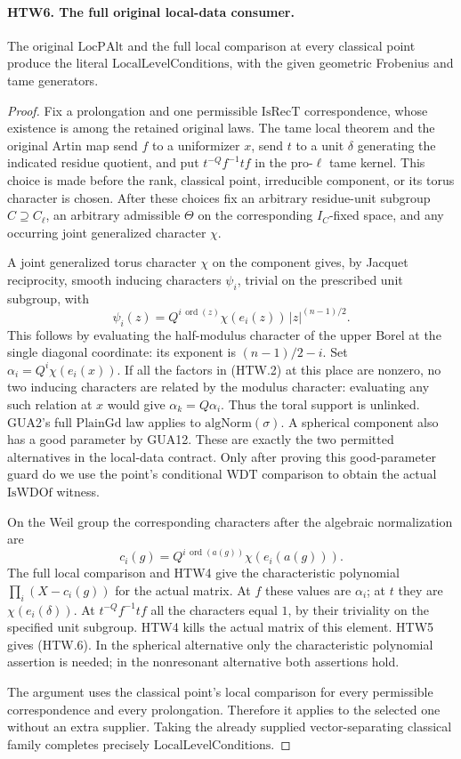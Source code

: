 \paragraph{HTW6. The full original local-data consumer.}
\label{claim:HTW6}
The original \(\mathrm{LocPAlt}\) and the full local comparison
at every classical point produce the literal
\(\mathrm{LocalLevelConditions}\), with the given geometric
Frobenius and tame generators.
\begin{proof}
Fix a prolongation and one permissible \(\mathrm{IsRecT}\)
correspondence, whose existence is among the retained
original laws.  The tame local theorem and the original
Artin map send \(f\) to a uniformizer \(x\), send \(t\)
to a unit \(\delta\) generating the indicated residue
quotient, and put \(t^{-Q}f^{-1}tf\) in the pro-\(\ell\)
tame kernel.  This choice is made before the rank,
classical point, irreducible component, or its torus
character is chosen.  After these choices fix an
arbitrary residue-unit subgroup \(C\supseteq C_\ell\),
an arbitrary admissible \(\Theta\) on the corresponding
\(I_C\)-fixed space, and any occurring joint
generalized character \(\chi\).

A joint generalized torus character \(\chi\) on the
component gives, by Jacquet reciprocity, smooth inducing
characters \(\psi_i\), trivial on the prescribed unit
subgroup, with
\[
 \psi_i(z)=Q^{i\,\operatorname{ord}(z)}
     \chi(e_i(z))\,|z|^{(n-1)/2}.
 \tag{HTW.7}
\]
This follows by evaluating the half-modulus character
of the upper Borel at the single diagonal coordinate:
its exponent is \((n-1)/2-i\).
Set \(\alpha_i=Q^i\chi(e_i(x))\).
If all the factors in (HTW.2) at this place are nonzero,
no two inducing characters are related by the modulus
character: evaluating any such relation at \(x\) would
give \(\alpha_k=Q\alpha_i\).  Thus the toral support is
unlinked.  GUA2's full \(\mathrm{PlainGd}\) law applies
to \(\mathrm{algNorm}(\sigma)\).  A spherical component
also has a good parameter by GUA12.
These are exactly the two permitted alternatives in
the local-data contract.  Only after proving this
good-parameter guard do we use the point's conditional
\(\mathrm{WDT}\) comparison to obtain the actual
\(\mathrm{IsWDOf}\) witness.

On the Weil group the corresponding characters after
the algebraic normalization are
\[
 c_i(g)=Q^{i\,\operatorname{ord}(a(g))}
                         \chi(e_i(a(g))).
 \tag{HTW.8}
\]
The full local comparison and HTW4 give the characteristic
polynomial \(\prod_i(X-c_i(g))\) for the actual matrix.
At \(f\) these values are \(\alpha_i\); at \(t\) they
are \(\chi(e_i(\delta))\).  At \(t^{-Q}f^{-1}tf\)
all the characters equal \(1\), by their triviality
on the specified unit subgroup.  HTW4 kills the actual
matrix of this element.  HTW5 gives (HTW.6).
In the spherical alternative only the characteristic
polynomial assertion is needed; in the nonresonant
alternative both assertions hold.

The argument uses the classical point's local comparison
for every permissible correspondence and every
prolongation.  Therefore it applies to the selected one
without an extra supplier.  Taking the already supplied
vector-separating classical family completes precisely
\(\mathrm{LocalLevelConditions}\).
\end{proof}
